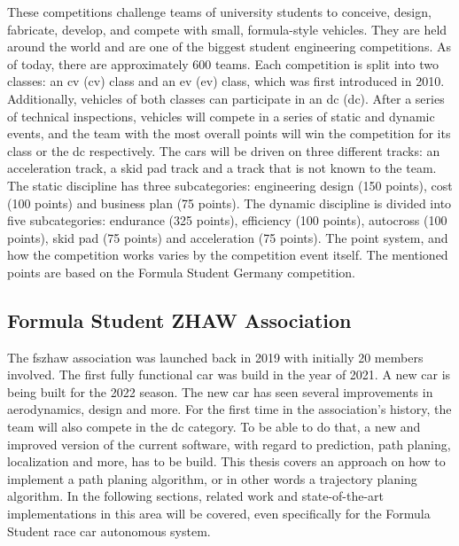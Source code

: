 These competitions challenge teams of university students to conceive, design, fabricate, develop, and compete with small, formula-style vehicles. They are held around the world and are one of the biggest student engineering competitions. As of today, there are approximately 600 teams. \cite{sae_student_events}
Each competition is split into two classes: an \acrlong{cv} (\acrshort{cv}) class and an \acrlong{ev} (\acrshort{ev}) class, which was first introduced in 2010. Additionally, vehicles of both classes can participate in an \acrlong{dc} (\acrshort{dc}). After a series of technical inspections, vehicles will compete in a series of static and dynamic events, and the team with the most overall points will win the competition for its class or the \acrshort{dc} respectively. The cars will be driven on three different tracks: an acceleration track, a skid pad track and a track that is not known to the team. The static discipline has three subcategories: engineering design (150 points), cost (100 points) and business plan (75 points). The dynamic discipline is divided into five subcategories: endurance (325 points), efficiency (100 points), autocross (100 points), skid pad (75 points) and acceleration (75 points). The point system, and how the competition works varies by the competition event itself. The mentioned points are based on the Formula Student Germany competition.
\cite{amz_racing_history}

\subsection{Formula Student ZHAW Association}

The \acrlong{fszhaw} association was launched back in 2019 with initially 20 members involved. The first fully functional car was build in the year of 2021. A new car  is being built for the 2022 season. The new car has seen several improvements in aerodynamics, design and more. \cite{fszhaw_launch}
For the first time in the association's history, the team will also compete in the \acrshort{dc} category.
To be able to do that, a new and improved version of the current software, with regard to prediction, path planing, localization and more, has to be build. This thesis covers an approach on how to implement a path planing algorithm, or in other words a trajectory planing algorithm.
In the following sections, related work and state-of-the-art implementations in this area will be covered, even specifically for the Formula Student race car autonomous system.

